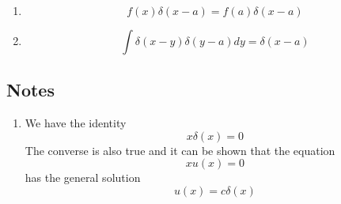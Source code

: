 \begin{enumerate}[label=\textbf{Property \arabic*},start=1]
				\item
				\begin{equation}
					f(x) \delta(x-a) = f(a) \delta(x-a)
				\end{equation}

				\item
				\begin{equation}
					\int \delta(x-y) \delta(y-a) dy = \delta(x-a)
				\end{equation}
				
			
		\end{enumerate}
		
		\subsection{Notes}
		\begin{enumerate}[label=\textbf{Note : \ \arabic*},start=1]
			\item 
			We have the identity
			\begin{equation}
				x\delta(x) = 0
			\end{equation}
			The converse is also true and it can be shown that the equation
			\begin{equation}
				x u(x) = 0
			\end{equation}
			has the general solution
			\begin{equation}
				u(x) = c \delta(x)
			\end{equation}
			

\end{enumerate}
